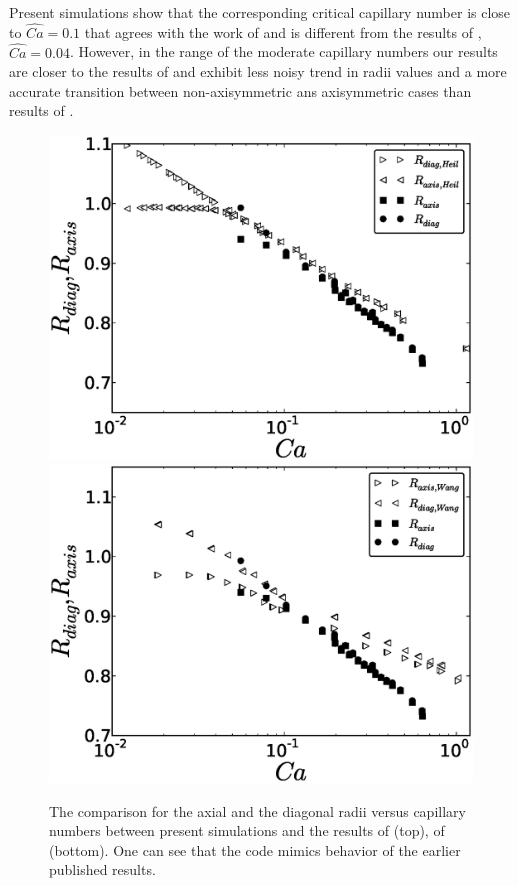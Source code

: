 \documentclass[preprint,12pt]{elsarticle}
\begin{document}
Present simulations show that the corresponding critical capillary number is close to
$\widehat{Ca}=0.1$ that agrees with the work of \citet{wang-non-circular} and is different from the
results of \citet{heil-threedim}, $\widehat{Ca}=0.04$. However, in the range of the moderate
capillary numbers our results are closer to the results of \citet{heil-threedim} and exhibit
less noisy trend in radii values and a more accurate transition between non-axisymmetric ans
axisymmetric cases than results of \citet{wang-non-circular}. 
\begin{figure}[ht]
\includegraphics[width=\textwidth]{Figures/capillaries_comparison_heil.eps}\\
\includegraphics[width=\textwidth]{Figures/capillaries_comparison_wang.eps}\\
\caption{The comparison for the axial and the diagonal radii
versus capillary numbers between present simulations and the results of \citet{heil-threedim}
(top), of \citet{wang-non-circular} (bottom). One can see that
the code mimics
behavior of the earlier published results.  \label{fig:capillary:comparison}} 
\end{figure}
\end{document}

